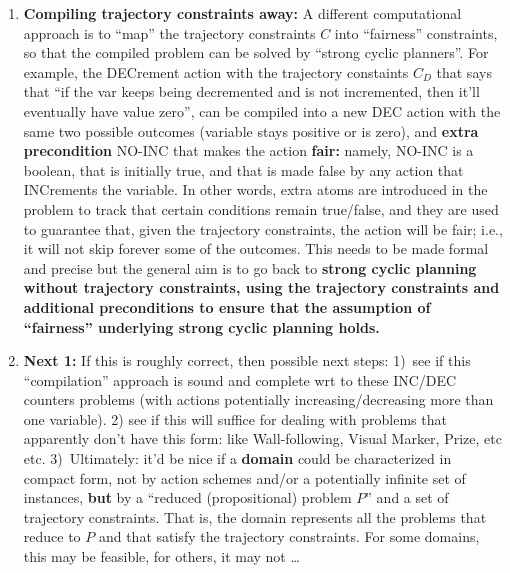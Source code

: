 \documentclass{article}
\begin{document}
\begin{enumerate}
\item \textbf{Compiling  trajectory constraints away:}   A different computational approach is to ``map'' the trajectory constraints $C$ into ``fairness'' constraints,
   so that the compiled  problem   can be solved by ``strong cyclic planners''. For example, the DECrement action  with the  trajectory constaints $C_D$ that
  says that ``if the var keeps being decremented and is not incremented, then it'll eventually have value zero'', can be compiled
  into a new  DEC action with the same two possible outcomes (variable stays positive or is zero), and \textbf{extra precondition}
  NO-INC that makes the action \textbf{fair:} namely, NO-INC is a boolean, that is initially true, and that is made false by any action
  that INCrements the variable. In other words, extra atoms are introduced in the problem to track that certain conditions remain true/false,
  and they are used to guarantee that, given  the trajectory constraints, the action will be fair; i.e., it will not skip forever some of the
  outcomes. This needs to be made formal and precise but the general aim  is to go back to \textbf{strong cyclic planning without trajectory constraints,
    using the trajectory constraints and additional preconditions to ensure that the assumption of ``fairness'' underlying strong cyclic planning holds.}

  \item \textbf{Next 1:} If this is roughly correct, then possible next steps: 1)~see if this ``compilation'' approach is sound and complete wrt to these
    INC/DEC counters problems (with actions potentially increasing/decreasing more than one variable). 2) see if this will suffice for dealing
    with problems that apparently don't have this form: like Wall-following, Visual Marker, Prize, etc etc. 3)~Ultimately: it'd be nice if a \textbf{domain}
    could be characterized in compact form, not by action schemes and/or a  potentially infinite set of instances, 
    \textbf{but} by a ``reduced (propositional) problem $P$'' and a set of  trajectory constraints. That is, the domain represents all the problems
     that reduce to $P$  and that satisfy the trajectory constraints. For some domains, this may be feasible, for others, it may not \ldots


\end{enumerate}
\end{document}
